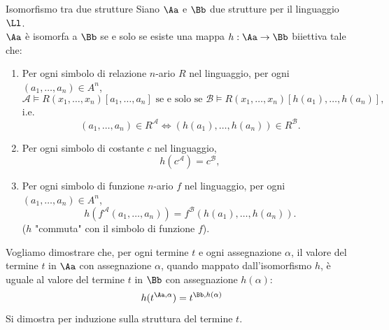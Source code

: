 \documentclass[a4paper,11pt]{report}
\begin{document}
\begin{defframe}{Isomorfismo tra due strutture}{}
    Siano \( \Aa \) e \( \Bb \) due strutture per il linguaggio \( \Ll \). \\
    \( \Aa \) è isomorfa a \( \Bb \) se e solo se esiste una mappa \( h: \Aa \to \Bb \) biiettiva tale che:
\begin{enumerate}
    \item[(1)] Per ogni simbolo di relazione $n$-ario $R$ nel linguaggio, per ogni $(a_1, \dots, a_n) \in A^n$,
    \[
    \mathcal{A} \models R(x_1, \dots, x_n)[a_1, \dots, a_n] \text{ se e solo se } \mathcal{B} \models R(x_1, \dots, x_n)[h(a_1), \dots, h(a_n)],
    \]
    i.e.
    \[
    (a_1, \dots, a_n) \in R^{\mathcal{A}} \iff (h(a_1), \dots, h(a_n)) \in R^{\mathcal{B}}.
    \]
    
    \item[(2)] Per ogni simbolo di costante $c$ nel linguaggio,
    \[
    h(c^{\mathcal{A}}) = c^{\mathcal{B}},
    \]
    
    \item[(3)] Per ogni simbolo di funzione $n$-ario $f$ nel linguaggio, per ogni $(a_1, \dots, a_n) \in A^n$,
    \[
    h(f^{\mathcal{A}}(a_1, \dots, a_n)) = f^{\mathcal{B}}(h(a_1), \dots, h(a_n)).
    \]
    ($h$ "commuta" con il simbolo di funzione $f$).
\end{enumerate}

\end{defframe}

Vogliamo dimostrare che, per ogni termine $t$ e ogni assegnazione $\alpha$,
il valore del termine \(t\) in \(\Aa\) con assegnazione \(\alpha\), quando mappato dall'isomorfismo \(h\), è uguale
al valore del termine \(t\) in \(\Bb\) con assegnazione \(h(\alpha)\):
\[ h(t^{\Aa, \alpha}) = t^{\Bb, h(\alpha)} \]
Si dimostra per induzione sulla struttura del termine \(t\).
\end{document}
